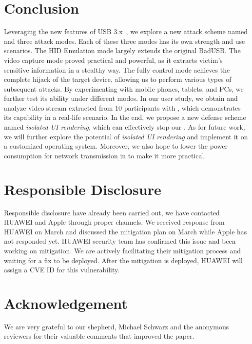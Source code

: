 \section{Conclusion}
\label{sec:conclusion}

Leveraging the new features of \ac{USB} 3.x~\cite{usb30,usb31,usb32}, we explore a
new attack scheme named \tool and three attack modes. Each of these three modes
has its own strength and use scenarios. The \ac{HID} Emulation mode largely extends the
original BadUSB. The video capture mode proved practical and powerful, as it extracts
victim's sensitive information in a stealthy way. The fully control mode
achieves the complete hijack of the target device, allowing us to perform various
types of subsequent attacks. By experimenting \tool with mobile phones, tablets,
and PCs, we further test its ability under different modes. In our user study, we
obtain and analyze video stream extracted from 10 participants with \tool,
which demonstrates its capability in a real-life scenario. In the end, we
propose a new defense scheme named \textit{isolated UI rendering}, which can
effectively stop our \tool.
As for future work, we will further explore the potential of \textit{isolated UI
rendering} and implement it on a customized operating system. Moreover, we also
hope to lower the power consumption for network transmission in \tool to make
it more practical.

\section{Responsible Disclosure}
Responsible disclosure have already been carried out, we have contacted HUAWEI and Apple through proper channels. We received response from HUAWEI on March  and discussed the mitigation plan on March  while Apple has not responded yet. HUAWEI security team has confirmed this issue and been working on mitigation. We are actively facilitating their mitigation process and waiting for a fix to be deployed. After the mitigation is deployed, HUAWEI will assign a CVE ID for this vulnerability.

\section{Acknowledgement}
We are very grateful to our shepherd, Michael Schwarz and the anonymous reviewers for their valuable comments that improved the paper.